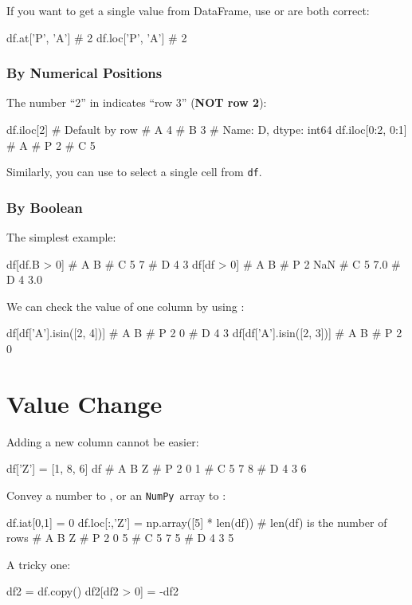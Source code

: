 \documentclass{report}
\newcommand{\pkg}[1]{\texttt{#1}}
\newcommand{\NumPy}{\pkg{NumPy}}
\newcommand{\Emph}[1]{\textcolor{cyan!80!white}{{\bfseries #1}}}
\begin{document}
If you want to get a single value from DataFrame, use  or  are both correct:
\begin{py}
df.at['P', 'A']
# 2
df.loc['P', 'A']
# 2
\end{py}

\subsubsection{By Numerical Positions}
The number ``2'' in  indicates ``row 3'' (\Emph{NOT row 2}):
\begin{py}
df.iloc[2] # Default by row
# A    4
# B    3
# Name: D, dtype: int64
df.iloc[0:2, 0:1]
#    A
# P  2
# C  5
\end{py}

Similarly, you can use  to select a single cell from \texttt{df}. 

\subsubsection{By Boolean}
The simplest example:
\begin{py}
df[df.B > 0]
#    A  B
# C  5  7
# D  4  3
df[df > 0]
#    A    B
# P  2  NaN
# C  5  7.0
# D  4  3.0
\end{py}

We can check the value of one column by using :
\begin{py}
df[df['A'].isin([2, 4])]
#    A  B
# P  2  0
# D  4  3
df[df['A'].isin([2, 3])]
#    A  B
# P  2  0
\end{py}

\section{Value Change}
Adding a new column cannot be easier:
\begin{py}
df['Z'] = [1, 8, 6]
df
#    A  B  Z
# P  2  0  1
# C  5  7  8
# D  4  3  6
\end{py}

Convey a number to , or an \NumPy\ array to : 
\begin{py}
df.iat[0,1] = 0
df.loc[:,'Z'] = np.array([5] * len(df)) # len(df) is the number of rows
#    A  B  Z
# P  2  0  5
# C  5  7  5
# D  4  3  5
\end{py}

A tricky one:
\begin{py}
df2 = df.copy()
df2[df2 > 0] = -df2
\end{py}
\end{document}
